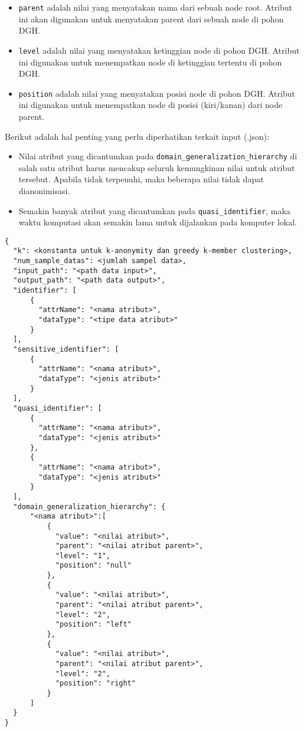 \begin{itemize}
\begin{itemize}
\item \texttt{parent} adalah nilai yang menyatakan nama dari sebuah node root. Atribut ini akan digunakan untuk menyatakan parent dari sebuah node di pohon DGH.

\item \texttt{level} adalah nilai yang menyatakan ketinggian node di pohon DGH. Atribut ini digunakan untuk menempatkan node di ketinggian tertentu di pohon DGH.

\item \texttt{position} adalah nilai yang menyatakan posisi node di pohon DGH. Atribut ini digunakan untuk menempatkan node di posisi (kiri/kanan) dari node parent.
\end{itemize}

\end{itemize}

\noindent Berikut adalah hal penting yang perlu diperhatikan terkait input (.json):

\begin{itemize}

\item Nilai atribut yang dicantumkan pada \texttt{domain\_generalization\_hierarchy} di salah satu atribut harus mencakup seluruh kemungkinan nilai untuk atribut tersebut. Apabila tidak terpenuhi, maka beberapa nilai tidak dapat dianonimisasi.

\item Semakin banyak atribut yang dicantumkan pada \texttt{quasi\_identifier}, maka waktu komputasi akan semakin lama untuk dijalankan pada komputer lokal.

\end{itemize}




\newpage
\begin{lstlisting}[basicstyle=\ttfamily, frame=single,
	columns=fullflexible, keepspaces=true, breaklines=true, label=lst:anon_json, caption=Input JSON untuk Anonimisasi Data]
{
  "k": <konstanta untuk k-anonymity dan greedy k-member clustering>,
  "num_sample_datas": <jumlah sampel data>,
  "input_path": "<path data input>",
  "output_path": "<path data output>",
  "identifier": [
      {
        "attrName": "<nama atribut>",
        "dataType": "<tipe data atribut>"
      }
  ],
  "sensitive_identifier": [
      {
        "attrName": "<nama atribut>",
        "dataType": "<jenis atribut>"
      }
  ],
  "quasi_identifier": [
      {
        "attrName": "<nama atribut>",
        "dataType": "<jenis atribut>"
      },
      {
        "attrName": "<nama atribut>",
        "dataType": "<jenis atribut>"
      }
  ],
  "domain_generalization_hierarchy": {
      "<nama atribut>":[
          {
            "value": "<nilai atribut>",
            "parent": "<nilai atribut parent>",
            "level": "1",
            "position": "null"
          },
          {
            "value": "<nilai atribut>",
            "parent": "<nilai atribut parent>",
            "level": "2",
            "position": "left"
          },
          {
            "value": "<nilai atribut>",
            "parent": "<nilai atribut parent>",
            "level": "2",
            "position": "right"
          }
      ] 
  }
}
\end{lstlisting}


